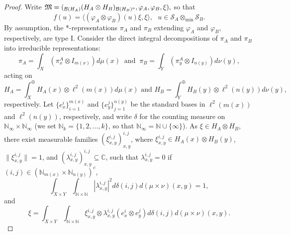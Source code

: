 \documentclass[11pt]{amsart}
\theoremstyle{definition}
\newcommand\nph{\varphi}
\newcommand{\cl}[1]{\mathcal{#1}}
\newcommand{\bb}[1]{\mathbb{#1}}
\begin{document}
\begin{proof}
Write 
$\frak{M} = (_{\cl B(H_A)}(H_A\otimes H_B)_{\cl B(H_B)^o}, 
\nph_A, \nph_B,\xi),$
so that 
$$f(u) = \langle(\varphi_A\otimes\varphi_B)(u)\xi,\xi\rangle, 
\ \ \ u\in \cl S_A\otimes_{\min} \cl S_B.$$ 
By assumption, the *-representations $\pi_A$ and $\pi_B$ extending 
$\nph_A$ and $\nph_B$, respectively, are type I. 
Consider the direct integral decompositions of $\pi_A$ and $\pi_B$ into irreducible representations: 
  $$\pi_A=\int_X (\pi_x^A\otimes I_{m(x)})d\mu(x)
  \ \mbox{ and } \ \pi_B=\int_Y (\pi_y^A\otimes I_{n(y)})d\nu(y),$$ 
  acting on
  $$H_A=\int_X^\oplus H_A(x)\otimes\ell^2(m(x))d\mu(x) 
  \mbox{ and } H_B=\int_Y^\oplus H_B(y)\otimes\ell^2(n(y))d\nu(y),$$ respectively. 
  Let $\{e_x^i\}_{i=1}^{m(x)}$ and $\{e_y^j\}_{j=1}^{n(y)}$ be the standard bases in $\ell^2(m(x))$ and $\ell^2(n(y))$, respectively, 
  and write $\delta$ for the counting measure on $\mathbb N_\infty\times \mathbb N_{\infty}$
  (we set $\mathbb N_k=\{1,2,\ldots, k\}$, so that 
  $\bb{N}_{\infty} = \bb{N}\cup\{\infty\}$). 
  As $\xi\in H_A\otimes H_B$, there exist measurable 
  families $(\xi_{x,y}^{i,j})_{x,y}^{i,j}$, where 
  $\xi_{x,y}^{i,j} \in H_A(x)\otimes H_B(y)$, 
  $\|\xi_{x,y}^{i,j}\|=1$, and 
  $(\lambda_{x,y}^{i,j})_{x,y}^{i,j}\subseteq \mathbb C$, such that $\lambda_{x,y}^{i,j}=0$ if  $(i,j)\in (\mathbb N_{m(x)}\times\mathbb N_{n(y)})^c$,  
  $$\int_{X\times Y}\int_{ \mathbb N\times\mathbb N}|\lambda_{x,y}^{i,j}|^2d\delta(i,j)d(\mu\times\nu)(x,y)=1,$$ 
  and 
  $$\xi = \int_{X\times Y} \int_{\mathbb N\times\mathbb N}\xi_{x,y}^{i,j}\otimes\lambda_{x,y}^{i,j}(e_x^i\otimes e_{y}^j)d\delta(i,j)d(\mu\times\nu)(x,y).$$ 
  

\end{proof}
\end{document}
